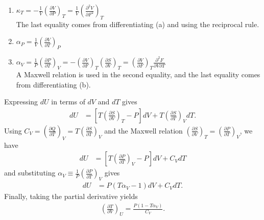 \documentclass[a4paper,12pt]{article}
\begin{document}
\begin{enumerate}[label=\textbf{[\arabic*]}]
\begin{enumerate}
                \item
                    $\kappa_T = -{\frac{1}{V} \left( \frac{\partial V}{\partial P} \right)_T} = \frac{1}{V} \left( \frac{\partial^2 V}{\partial F^2} \right)_T$ \\
                    The last equality comes from differentiating (a) and using the reciprocal rule.

                \item
                    $\alpha_P = \frac{1}{V} \left( \frac{\partial V}{\partial T} \right)_P$

                \item
                    $\alpha_V = \frac{1}{P} \left( \frac{\partial P}{\partial T} \right)_V = -{\left( \frac{\partial V}{\partial F} \right)_T} \left( \frac{\partial S}{\partial V} \right)_T = {\left( \frac{\partial V}{\partial F} \right)_T} \frac{\partial^2 F}{\partial V \partial T}$ \\
                    A Maxwell relation is used in the second equality, and the last equality comes from differentiating (b).
            \end{enumerate}

        \item
            Expressing $dU$ in terms of $dV$ and $dT$ gives
            \begin{align*}
                dU &= \left[ T \left( \frac{\partial S}{\partial V} \right)_T - P \right] dV + T \left( \frac{\partial S}{\partial T} \right)_V dT.
            \end{align*}
            Using $C_V = \left( \frac{\partial Q}{\partial T} \right)_V = T \left( \frac{\partial S}{\partial T} \right)_V$ and the Maxwell relation $\left( \frac{\partial S}{\partial V} \right)_T = \left( \frac{\partial P}{\partial T} \right)_V$, we have
            \begin{align*}
                dU &= \left[ T \left( \frac{\partial P}{\partial T} \right)_V - P \right] dV + C_V dT
            \end{align*}
            and substituting $\alpha_V \equiv \frac{1}{P} \left( \frac{\partial P}{\partial T} \right)_V$ gives
            \begin{align*}
                dU &= P(T \alpha_V - 1) dV + C_V dT.
            \end{align*}
            Finally, taking the partial derivative yields
            \begin{align*}
                \left( \frac{\partial T}{\partial V} \right)_U = \frac{P(1 - T \alpha_V)}{C_V}.
            \end{align*}

\end{enumerate}
\end{document}
